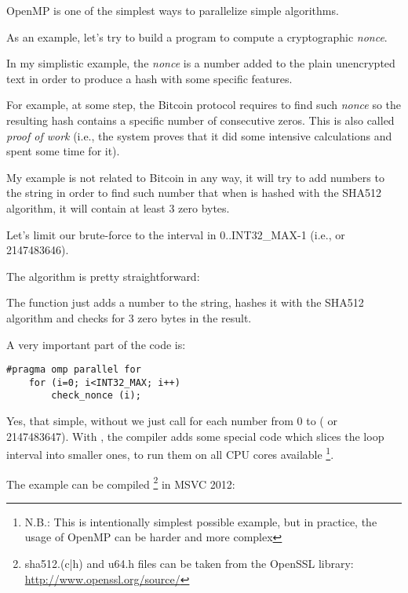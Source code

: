 \label{openmp}

OpenMP is one of the simplest ways to parallelize simple algorithms.


As an example, let's try to build a program to compute a cryptographic \emph{nonce}.

In my simplistic example, 
the \emph{nonce} is a number added to the plain unencrypted text in order to produce a hash with some specific 
features.

For example, at some step, the Bitcoin protocol requires to find such \emph{nonce} so the resulting hash
contains a specific number of consecutive zeros.
This is also called \emph{proof of work}
(i.e., the system proves that it did some intensive calculations and spent some time for it).

My example is not related to Bitcoin in any way, 
it will try to add numbers to the 
string in order to find such number that when 
 is hashed with the SHA512 algorithm, it will contain at least 3 zero bytes.

Let's limit our brute-force to the interval in
0..INT32\_MAX-1 (i.e.,  or 2147483646).

The algorithm is pretty straightforward:



The  function just adds a number to the string, 
hashes it with the SHA512 algorithm and checks for 3 zero bytes in the result.

A very important part of the code is:

\begin{lstlisting}[style=customc]
	#pragma omp parallel for
	for (i=0; i<INT32_MAX; i++)
		check_nonce (i);
\end{lstlisting}

Yes, that simple, without  
we just call  for each number from 0 to 
 ( or 2147483647).
With , the compiler adds some special 
code which slices the loop interval into smaller ones,
to run them on all \ac{CPU} cores available
\footnote{N.B.: This is intentionally simplest possible
example, but in practice, the usage of OpenMP can be harder and more complex}.

The example can be compiled
\footnote{sha512.(c|h) and u64.h 
files can be taken from the OpenSSL library:
\url{http://www.openssl.org/source/}}
in MSVC 2012:

